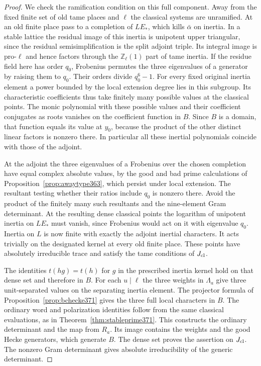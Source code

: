 \documentclass[a4paper,11pt]{article}
\theoremstyle{definition}
\theoremstyle{remark}
\newcommand{\ZZ}{\mathbb Z}\newcommand{\ord}{\operatorname{ord}}
\numberwithin{equation}{section}
\begin{document}
\begin{proof}
We check the ramification condition on this full component.
Away from the fixed finite set of old tame places and \(\ell\)
the classical systems are unramified. At an old finite place
pass to a completion of \(LE_*\), which kills
\(\bar\alpha\) on inertia. In a stable lattice the residual
image of this inertia is unipotent upper triangular, since
the residual semisimplification is the split adjoint triple.
Its integral image is pro-\(\ell\) and hence factors through
the \(\ZZ_\ell(1)\) part of tame inertia. If the residue
field here has order \(q_0\), Frobenius permutes the three
eigenvalues of a generator by raising them to \(q_0\).
Their orders divide \(q_0^6-1\). For every fixed original
inertia element a power bounded by the local extension degree
lies in this subgroup. Its characteristic coefficients thus
take finitely many possible values at the classical points.
The monic polynomial with these possible values and their
coefficient conjugates as roots vanishes on the coefficient
function in \(B\). Since \(B\) is a domain, that function
equals its value at \(y_0\), because the product of the
other distinct linear factors is nonzero there. In
particular all these inertial
polynomials coincide with those of the adjoint.

At the adjoint the three eigenvalues of a Frobenius over
the chosen completion have equal complex absolute values,
by the good and bad prime calculations of
Proposition~\ref{prop:awaytype363}, which persist under
local extension. The resultant testing whether their ratios
include \(q_0\) is nonzero there. Avoid the product of the
finitely many such resultants and the nine-element Gram
determinant. At the resulting dense classical points the
logarithm of unipotent inertia on \(LE_*\) must vanish,
since Frobenius would act on it with eigenvalue \(q_0\).
Inertia on \(L\) is now finite with exactly the adjoint
inertial characters. It acts trivially on the designated
kernel at every old finite place. These points have
absolutely irreducible trace and satisfy the tame
conditions of \(J_{\rm cl}\).

The identities \(t(hg)=t(h)\) for \(g\) in the prescribed
inertia kernel hold on that dense set and therefore in \(B\).
For each \(u\mid\ell\) the three weights in \(\Lambda_a\)
give three unit-separated values on the separating inertia
element. The projector formula of
Proposition~\ref{prop:bchecke371} gives the three full local
characters in \(B\). The ordinary word and polarization
identities follow from the same classical evaluations, as
in Theorem~\ref{thm:stableprime371}. This constructs the
ordinary determinant and the map from \(R_a\). Its image
contains the weights and the good Hecke generators, which
generate \(B\). The dense set proves the assertion on
\(J_{\rm cl}\). The nonzero Gram determinant gives absolute
irreducibility of the generic determinant.
\end{proof}
\end{document}
